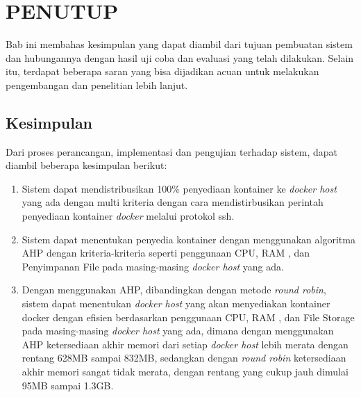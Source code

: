 \chapter{PENUTUP}
  Bab ini membahas kesimpulan yang dapat diambil dari tujuan pembuatan sistem dan hubungannya dengan hasil uji coba dan evaluasi yang telah dilakukan. Selain itu, terdapat beberapa saran yang bisa dijadikan acuan untuk melakukan pengembangan dan penelitian lebih lanjut.
  \section{Kesimpulan}
  Dari proses perancangan, implementasi dan pengujian terhadap sistem, dapat diambil beberapa kesimpulan berikut:
  \begin{enumerate}
    \item Sistem dapat mendistribusikan 100\% penyediaan kontainer ke \textit{docker host} yang ada dengan multi kriteria dengan cara mendistirbusikan perintah penyediaan kontainer \textit{docker} melalui protokol ssh.  
    \item Sistem dapat menentukan penyedia kontainer dengan menggunakan algoritma AHP dengan kriteria-kriteria seperti penggunaan CPU, RAM , dan Penyimpanan File pada masing-masing \textit{docker host} yang ada.
    \item Dengan menggunakan AHP, dibandingkan dengan metode \textit{round robin}, sistem dapat menentukan \textit{docker host} yang akan menyediakan kontainer docker dengan efisien berdasarkan penggunaan CPU, RAM , dan File Storage pada masing-masing \textit{docker host} yang ada, dimana dengan menggunakan AHP ketersediaan akhir memori dari setiap \textit{docker host} lebih merata dengan rentang 628MB sampai 832MB, sedangkan dengan \textit{round robin} ketersediaan akhir memori sangat tidak merata, dengan rentang yang cukup jauh dimulai 95MB sampai 1.3GB. 
    
  \end{enumerate}
